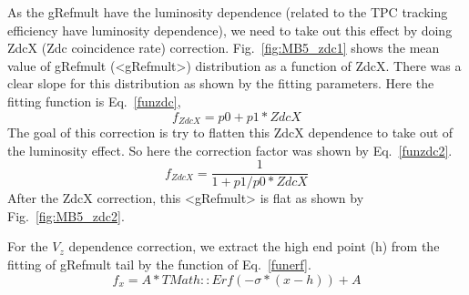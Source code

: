 As the gRefmult have the luminosity dependence (related to the TPC tracking efficiency have luminosity dependence), we need to take out this effect by doing ZdcX (Zdc coincidence rate) correction. Fig.~\ref{fig:MB5_zdc1} shows the mean value of gRefmult (<gRefmult>) distribution as a function of ZdcX. There was a clear slope for this distribution as shown by the fitting parameters. Here the fitting function is Eq.~\ref{funzdc},
\begin{equation}
f_{ZdcX} = p0 + p1*ZdcX
\label{funzdc}
\end{equation}
The goal of this correction is try to flatten this ZdcX dependence to take out of the luminosity effect. So here the correction factor was shown by  Eq.~\ref{funzdc2}.
\begin{equation}
f_{ZdcX} = \frac{1}{1 + p1/p0*ZdcX}
\label{funzdc2}
\end{equation}
After the ZdcX correction, this <gRefmult> is flat as shown by Fig.~\ref{fig:MB5_zdc2}.

For the $V_{z}$ dependence correction, we extract the high end point (h) from the fitting of gRefmult tail by the function of Eq.~\ref{funerf}.
\begin{equation}
f_{x} = A * TMath::Erf(-\sigma*(x-h)) + A
\label{funerf}
\end{equation}

